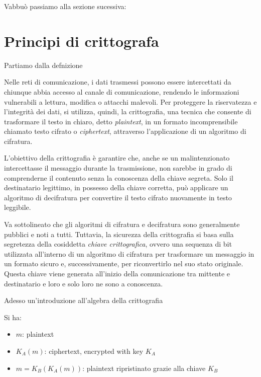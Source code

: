 Vabbuò passiamo alla sezione sucessiva:
\section{Principi di crittografa}
Partiamo dalla defnizione


Nelle reti di comunicazione, i dati trasmessi possono essere intercettati da chiunque abbia accesso al canale di comunicazione, rendendo le informazioni vulnerabili a lettura, modifica o attacchi malevoli. Per proteggere la riservatezza e l’integrità dei dati, si utilizza, quindi, la crittografia, una tecnica che consente di trasformare il testo in chiaro, detto \textit{plaintext}, in un formato incomprensibile chiamato testo cifrato o \textit{ciphertext}, attraverso l’applicazione di un algoritmo di cifratura.

L’obiettivo della crittografia è garantire che, anche se un malintenzionato intercettasse il messaggio durante la trasmissione, non sarebbe in grado di comprenderne il contenuto senza la conoscenza della chiave segreta. Solo il destinatario legittimo, in possesso della chiave corretta, può applicare un algoritmo di decifratura per convertire il testo cifrato nuovamente in testo leggibile.

Va sottolineato che gli algoritmi di cifratura e decifratura sono generalmente pubblici e noti a tutti. Tuttavia, la sicurezza della crittografia si basa sulla segretezza della cosiddetta \textit{chiave crittografica}, ovvero una sequenza di bit utilizzata all'interno di un algoritmo di cifratura per trasformare un messaggio in un formato sicuro e, successivamente, per riconvertirlo nel suo stato originale. Questa chiave viene generata all'inizio della comunicazione tra mittente e destinatario e loro e solo loro ne sono a conoscenza.

Adesso un'introduzione all'algebra della crittografia

Si ha:
\begin{itemize}
    \item $m$: plaintext
    \item $K_A(m)$: ciphertext, encrypted with key $K_A$
    \item $m = K_B(K_A(m))$: plaintext ripristinato grazie alla chiave $K_B$
\end{itemize}

